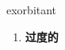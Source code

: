 
\begin{frame}
{\huge exorbitant}
\begin{center}
\begin{enumerate}\Large
  \item \textbf{过度的}
\end{enumerate}
\end{center}
\end{frame}
